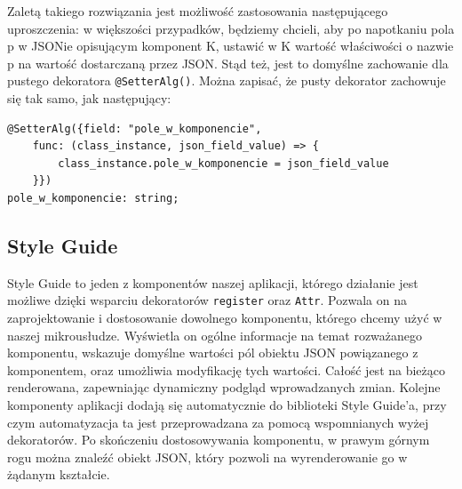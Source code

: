 \documentclass[licencjacka]{pracamgr}
\begin{document}
Zaletą takiego rozwiązania jest możliwość zastosowania następującego uproszczenia: w większości przypadków, będziemy chcieli, aby po napotkaniu pola p w JSONie opisującym komponent K, ustawić w K wartość właściwości o nazwie p na wartość dostarczaną przez JSON. Stąd też, jest to domyślne zachowanie dla pustego dekoratora
\texttt{@SetterAlg()}. Można zapisać, że pusty dekorator zachowuje się tak samo, jak następujący:

\begin{verbatim}
@SetterAlg({field: "pole_w_komponencie", 
    func: (class_instance, json_field_value) => { 
        class_instance.pole_w_komponencie = json_field_value 
    }})
pole_w_komponencie: string;
\end{verbatim}

\subsection{Style Guide}
Style Guide to jeden z komponentów naszej aplikacji, którego działanie jest możliwe dzięki wsparciu dekoratorów \texttt{register} oraz \texttt{Attr}. Pozwala on na zaprojektowanie i dostosowanie dowolnego komponentu, którego chcemy użyć w naszej mikrousłudze. Wyświetla on ogólne informacje na temat rozważanego komponentu, wskazuje domyślne wartości pól obiektu JSON powiązanego z komponentem, oraz umożliwia modyfikację tych wartości. Całość jest na bieżąco renderowana, zapewniając dynamiczny podgląd wprowadzanych zmian. Kolejne komponenty aplikacji dodają się automatycznie do biblioteki Style Guide'a, przy czym automatyzacja ta jest przeprowadzana za pomocą wspomnianych wyżej dekoratorów. Po skończeniu dostosowywania komponentu, w prawym górnym rogu można znaleźć obiekt JSON, który pozwoli na wyrenderowanie go w żądanym kształcie.\\
\end{document}
